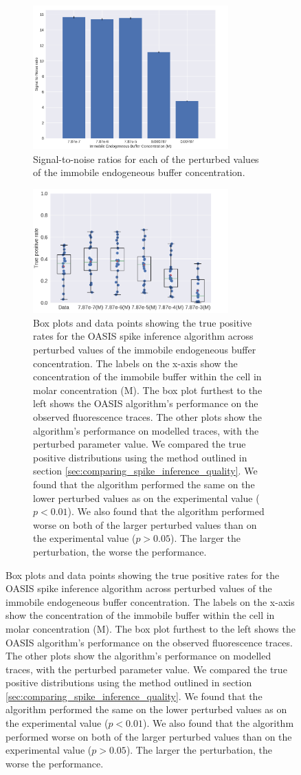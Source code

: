 \documentclass[a4paper,12pt]{article}
\theoremstyle{definition}
\begin{document}
\begin{figure}[p]
  \begin{subfigure}{\textwidth}
    \centering
    \includegraphics[width=0.825\textwidth]{figures/immobile_perturbed_snr.png}
    \caption{Signal-to-noise ratios for each of the perturbed values of the immobile endogeneous buffer concentration.}
    \label{fig:immobile_perturbed_snr.png}
  \end{subfigure}
  \begin{subfigure}{\textwidth}
    \centering
    \includegraphics[width=0.825\textwidth]{figures/immobile_perturbed_oasis_first_tp.png}
    \caption{Box plots and data points showing the true positive rates for the OASIS spike inference algorithm across perturbed values of the immobile endogeneous buffer concentration. The labels on the x-axis show the concentration of the immobile buffer within the cell in molar concentration (M). The box plot furthest to the left shows the OASIS algorithm's performance on the observed fluorescence traces. The other plots show the algorithm's performance on modelled traces, with the perturbed parameter value. We compared the true positive distributions using the method outlined in section \ref{sec:comparing_spike_inference_quality}. We found that the algorithm performed the same on the lower perturbed values as on the experimental value ($p < 0.01$). We also found that the algorithm performed worse on both of the larger perturbed values than on the experimental value ($p > 0.05$). The larger the perturbation, the worse the performance.}

\end{subfigure}
\end{figure}
\end{document}
